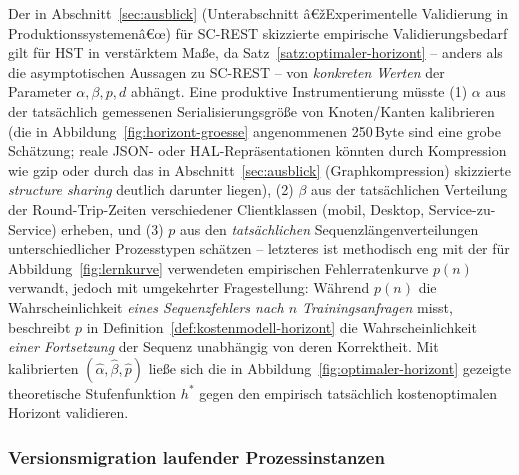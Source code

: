 ﻿\documentclass[a4paper,12pt]{article}
\theoremstyle{definition}
\begin{document}
Der in Abschnitt~\ref{sec:ausblick} (Unterabschnitt â€žExperimentelle Validierung in
Produktionssystemenâ€œ) für SC-REST skizzierte empirische Validierungsbedarf gilt für HST
in verstärktem Maße, da Satz~\ref{satz:optimaler-horizont} -- anders als die
asymptotischen Aussagen zu SC-REST -- von \emph{konkreten Werten} der Parameter
$\alpha,\beta,p,d$ abhängt. Eine produktive Instrumentierung müsste (1) $\alpha$ aus der
tatsächlich gemessenen Serialisierungsgröße von Knoten/Kanten kalibrieren (die in
Abbildung~\ref{fig:horizont-groesse} angenommenen 250\,Byte sind eine grobe Schätzung;
reale JSON- oder HAL-Repräsentationen könnten durch Kompression wie gzip oder durch das
in Abschnitt~\ref{sec:ausblick} (Graphkompression) skizzierte \emph{structure sharing}
deutlich darunter liegen), (2) $\beta$ aus der tatsächlichen Verteilung der
Round-Trip-Zeiten verschiedener Clientklassen (mobil, Desktop, Service-zu-Service)
erheben, und (3) $p$ aus den \emph{tatsächlichen} Sequenzlängenverteilungen
unterschiedlicher Prozesstypen schätzen -- letzteres ist methodisch eng mit der für
Abbildung~\ref{fig:lernkurve} verwendeten empirischen Fehlerratenkurve $p(n)$ verwandt,
jedoch mit umgekehrter Fragestellung: Während $p(n)$ die Wahrscheinlichkeit \emph{eines
Sequenzfehlers nach $n$ Trainingsanfragen} misst, beschreibt $p$ in
Definition~\ref{def:kostenmodell-horizont} die Wahrscheinlichkeit \emph{einer
Fortsetzung} der Sequenz unabhängig von deren Korrektheit. Mit kalibrierten
$(\hat\alpha,\hat\beta,\hat p)$ ließe sich die in
Abbildung~\ref{fig:optimaler-horizont} gezeigte theoretische Stufenfunktion $h^\ast$
gegen den empirisch tatsächlich kostenoptimalen Horizont validieren.

\subsubsection{Versionsmigration laufender Prozessinstanzen}
\end{document}
